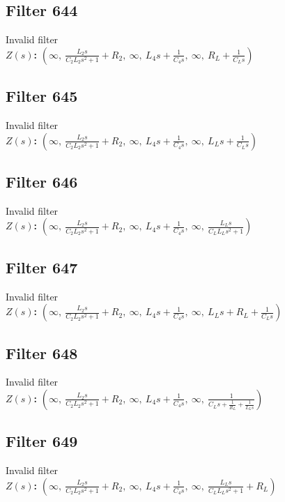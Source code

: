 \documentclass{article}
\begin{document}
\subsection*{Filter 644}
Invalid filter \\ 
\textbf{$Z(s)$:} $\left( \infty, \  \frac{L_{2} s}{C_{2} L_{2} s^{2} + 1} + R_{2}, \  \infty, \  L_{4} s + \frac{1}{C_{4} s}, \  \infty, \  R_{L} + \frac{1}{C_{L} s}\right)$ \\ 
\subsection*{Filter 645}
Invalid filter \\ 
\textbf{$Z(s)$:} $\left( \infty, \  \frac{L_{2} s}{C_{2} L_{2} s^{2} + 1} + R_{2}, \  \infty, \  L_{4} s + \frac{1}{C_{4} s}, \  \infty, \  L_{L} s + \frac{1}{C_{L} s}\right)$ \\ 
\subsection*{Filter 646}
Invalid filter \\ 
\textbf{$Z(s)$:} $\left( \infty, \  \frac{L_{2} s}{C_{2} L_{2} s^{2} + 1} + R_{2}, \  \infty, \  L_{4} s + \frac{1}{C_{4} s}, \  \infty, \  \frac{L_{L} s}{C_{L} L_{L} s^{2} + 1}\right)$ \\ 
\subsection*{Filter 647}
Invalid filter \\ 
\textbf{$Z(s)$:} $\left( \infty, \  \frac{L_{2} s}{C_{2} L_{2} s^{2} + 1} + R_{2}, \  \infty, \  L_{4} s + \frac{1}{C_{4} s}, \  \infty, \  L_{L} s + R_{L} + \frac{1}{C_{L} s}\right)$ \\ 
\subsection*{Filter 648}
Invalid filter \\ 
\textbf{$Z(s)$:} $\left( \infty, \  \frac{L_{2} s}{C_{2} L_{2} s^{2} + 1} + R_{2}, \  \infty, \  L_{4} s + \frac{1}{C_{4} s}, \  \infty, \  \frac{1}{C_{L} s + \frac{1}{R_{L}} + \frac{1}{L_{L} s}}\right)$ \\ 
\subsection*{Filter 649}
Invalid filter \\ 
\textbf{$Z(s)$:} $\left( \infty, \  \frac{L_{2} s}{C_{2} L_{2} s^{2} + 1} + R_{2}, \  \infty, \  L_{4} s + \frac{1}{C_{4} s}, \  \infty, \  \frac{L_{L} s}{C_{L} L_{L} s^{2} + 1} + R_{L}\right)$ \\ 
\end{document}
